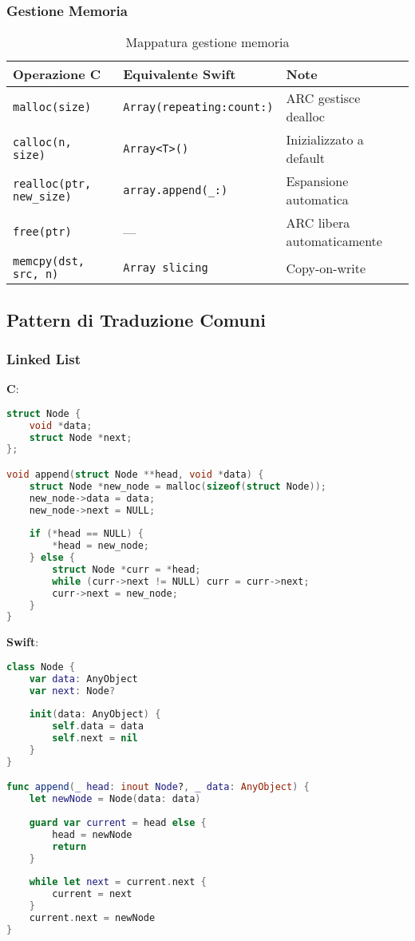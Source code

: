 \subsubsection{Gestione Memoria}

\begin{table}[h]
\centering
\begin{tabular}{@{}lll@{}}
\toprule
\textbf{Operazione C} & \textbf{Equivalente Swift} & \textbf{Note} \\
\midrule
\texttt{malloc(size)} & \texttt{Array(repeating:count:)} & ARC gestisce dealloc \\
\texttt{calloc(n, size)} & \texttt{Array<T>()} & Inizializzato a default \\
\texttt{realloc(ptr, new\_size)} & \texttt{array.append(\_:)} & Espansione automatica \\
\texttt{free(ptr)} & — & ARC libera automaticamente \\
\texttt{memcpy(dst, src, n)} & \texttt{Array slicing} & Copy-on-write \\
\bottomrule
\end{tabular}
\caption{Mappatura gestione memoria}
\label{tab:memory_mapping}
\end{table}

\subsection{Pattern di Traduzione Comuni}

\subsubsection{Linked List}

\textbf{C}:
\begin{lstlisting}[language=C]
struct Node {
    void *data;
    struct Node *next;
};

void append(struct Node **head, void *data) {
    struct Node *new_node = malloc(sizeof(struct Node));
    new_node->data = data;
    new_node->next = NULL;
    
    if (*head == NULL) {
        *head = new_node;
    } else {
        struct Node *curr = *head;
        while (curr->next != NULL) curr = curr->next;
        curr->next = new_node;
    }
}
\end{lstlisting}

\textbf{Swift}:
\begin{lstlisting}[language=Swift]
class Node {
    var data: AnyObject
    var next: Node?
    
    init(data: AnyObject) {
        self.data = data
        self.next = nil
    }
}

func append(_ head: inout Node?, _ data: AnyObject) {
    let newNode = Node(data: data)
    
    guard var current = head else {
        head = newNode
        return
    }
    
    while let next = current.next {
        current = next
    }
    current.next = newNode
}
\end{lstlisting}

